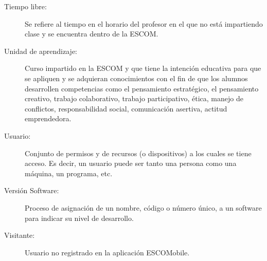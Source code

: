 \begin{description}
	\item[Tiempo libre:] Se refiere al tiempo en el horario del profesor en el que no está impartiendo clase y se encuentra dentro de la ESCOM.
	
	\item[Unidad de aprendizaje: ] Curso impartido en la ESCOM y que tiene la intención educativa para que se apliquen y se adquieran conocimientos con el fin de que los alumnos desarrollen competencias como el pensamiento estratégico, el pensamiento creativo, trabajo colaborativo, trabajo participativo, ética, manejo de conflictos, responsabilidad social, comunicación asertiva, actitud emprendedora.
	\item[Usuario:] Conjunto de permisos y de recursos (o dispositivos) a los cuales se tiene acceso. Es decir, un usuario puede ser tanto una persona como una máquina, un programa, etc.
	
	\item[Versión Software:] Proceso de asignación de un nombre, código o número único, a un software para indicar su nivel de desarrollo.
	\item[Visitante:] Usuario no registrado en la aplicación ESCOMobile.
\end{description}

